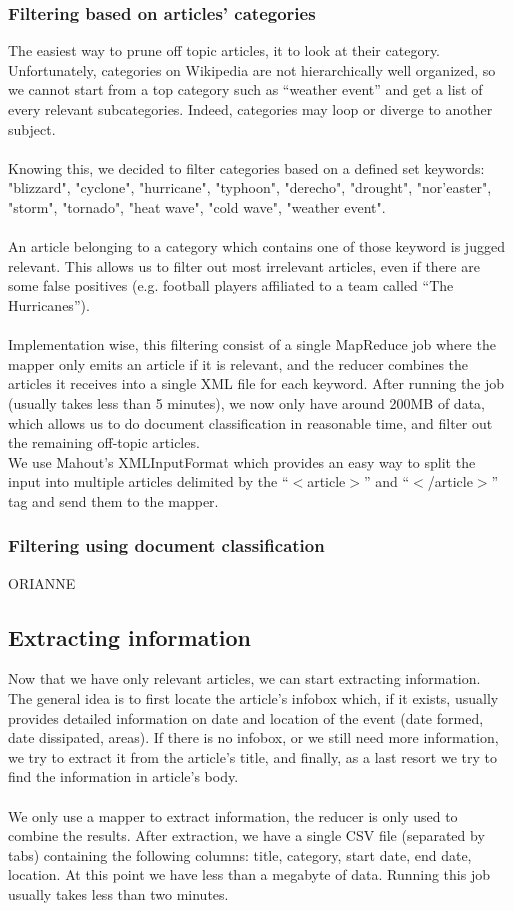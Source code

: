 \subsubsection{Filtering based on articles' categories}
The easiest way to prune off topic articles, it to look at their category. Unfortunately, categories on Wikipedia are not hierarchically well organized, so we cannot start from a top category such as ``weather event'' and get a list of every relevant subcategories. Indeed, categories may loop or diverge to another subject.\\\\
Knowing this, we decided to filter categories based on a defined set keywords: "blizzard", "cyclone", "hurricane", "typhoon", "derecho", "drought", "nor'easter", "storm", "tornado", "heat wave", "cold wave", "weather event". \\\\
An article belonging to a category which contains one of those keyword is jugged relevant. This allows us to filter out most irrelevant articles, even if there are some false positives (e.g. football players affiliated to a team called ``The Hurricanes'').\\\\
Implementation wise, this filtering consist of a single MapReduce job where the mapper only emits an article if it is relevant, and the reducer combines the articles it receives into a single XML file for each keyword. 
After running the job (usually takes less than 5 minutes), we now only have around 200MB of data, which allows us to do document classification in reasonable time, and filter out the remaining off-topic articles.\\ 
We use Mahout's XMLInputFormat which provides an easy way to split the input into multiple articles delimited by the ``$<$article$>$'' and ``$<$/article$>$'' tag and send them to the mapper.
\subsubsection{Filtering using document classification}
ORIANNE
\subsection{Extracting information}
Now that we have only relevant articles, we can start extracting information. \\
The general idea is to first locate the article's infobox which, if it exists, usually provides detailed information on date and location of the event (date formed, date dissipated, areas). If there is no infobox, or we still need more information, we try to extract it from the article's title, and finally, as a last resort we try to find the information in article's body.\\\\
We only use a mapper to extract information, the reducer is only used to combine the results.
After extraction, we have a single CSV file (separated by tabs) containing the following columns: title, category, start date, end date, location. At this point we have less than a megabyte of data. Running this job usually takes less than two minutes.
